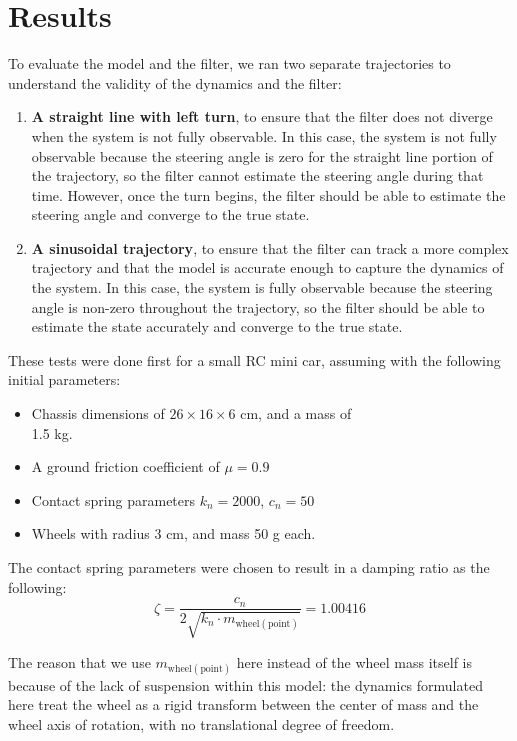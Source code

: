 \section{Results}


To evaluate the model and the filter, we ran two separate trajectories to understand the validity of the dynamics and the filter:

\begin{enumerate}
  \item \textbf{A straight line with left turn}, to ensure that the filter does not diverge when the system is not fully observable. In this case, the system is not fully observable because the steering angle is zero for the straight line portion of the trajectory, so the filter cannot estimate the steering angle during that time. However, once the turn begins, the filter should be able to estimate the steering angle and converge to the true state.
  \item \textbf{A sinusoidal trajectory}, to ensure that the filter can track a more complex trajectory and that the model is accurate enough to capture the dynamics of the system. In this case, the system is fully observable because the steering angle is non-zero throughout the trajectory, so the filter should be able to estimate the state accurately and converge to the true state.
\end{enumerate}

These tests were done first for a small RC mini car, assuming with the following initial parameters:
\begin{itemize}
  \item Chassis dimensions of $26 \times 16 \times 6$ cm, and a mass of \\ 1.5 kg.
  \item A ground friction coefficient of $\mu=0.9$
  \item Contact spring parameters $k_n=2000$, $c_n=50$
  \item Wheels with radius 3 cm, and mass 50 g each.
\end{itemize}

The contact spring parameters were chosen to result in a damping ratio as the following:
$$
\zeta = \frac{c_n}{2 \sqrt{k_n \cdot m_\mathrm{wheel(point)}}} = 1.00416
$$

The reason that we use $m_\mathrm{wheel(point)}$ here instead of the wheel mass itself is because of the lack of suspension within this model: the dynamics formulated here treat the wheel as a rigid transform between the center of mass and the wheel axis of rotation, with no translational degree of freedom.

